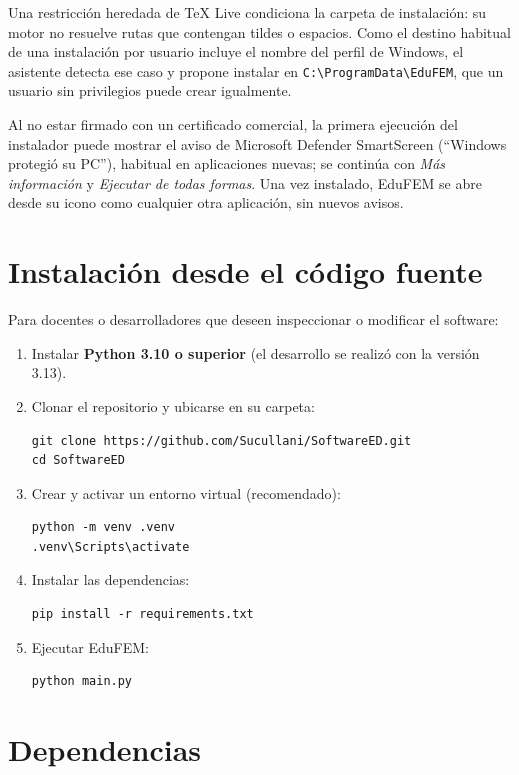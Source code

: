 Una restricción heredada de \TeX{} Live condiciona la carpeta de instalación: su motor no resuelve rutas que contengan tildes o espacios. Como el destino habitual de una instalación por usuario incluye el nombre del perfil de Windows, el asistente detecta ese caso y propone instalar en \texttt{C:\textbackslash ProgramData\textbackslash EduFEM}, que un usuario sin privilegios puede crear igualmente.

Al no estar firmado con un certificado comercial, la primera ejecución del instalador puede mostrar el aviso de Microsoft Defender SmartScreen (\enquote{Windows protegió su PC}), habitual en aplicaciones nuevas; se continúa con \emph{Más información} y \emph{Ejecutar de todas formas}. Una vez instalado, EduFEM se abre desde su icono como cualquier otra aplicación, sin nuevos avisos.

\section{Instalación desde el código fuente}

Para docentes o desarrolladores que deseen inspeccionar o modificar el software:

\begin{enumerate}
    \item Instalar \textbf{Python 3.10 o superior} (el desarrollo se realizó con la versión 3.13).
    \item Clonar el repositorio y ubicarse en su carpeta:
\begin{verbatim}
git clone https://github.com/Sucullani/SoftwareED.git
cd SoftwareED
\end{verbatim}
    \item Crear y activar un entorno virtual (recomendado):
\begin{verbatim}
python -m venv .venv
.venv\Scripts\activate
\end{verbatim}
    \item Instalar las dependencias:
\begin{verbatim}
pip install -r requirements.txt
\end{verbatim}
    \item Ejecutar EduFEM:
\begin{verbatim}
python main.py
\end{verbatim}
\end{enumerate}

\section{Dependencias}

